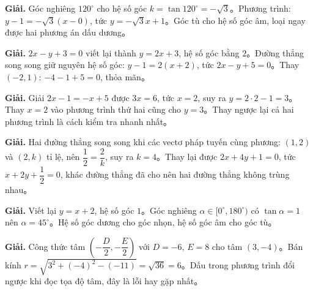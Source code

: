 \documentclass[11pt, a4paper]{article}
\begin{document}
\begin{dapan}[26 — Đáp án B]

\textbf{Giải.} Góc nghiêng $120^\circ$ cho hệ số góc $k=\tan120^\circ=-\sqrt{3}$。Phương trình: $y-1=-\sqrt{3}(x-0)$, tức $y=-\sqrt{3}x+1$。Góc tù cho hệ số góc âm, loại ngay được hai phương án dấu dương。


\end{dapan}
\vspace{0.3cm}
\begin{dapan}[27 — Đáp án B]

\textbf{Giải.} $2x-y+3=0$ viết lại thành $y=2x+3$, hệ số góc bằng $2$。Đường thẳng song song giữ nguyên hệ số góc: $y-1=2(x+2)$, tức $2x-y+5=0$。Thay $(-2,1)$: $-4-1+5=0$, thỏa mãn。


\end{dapan}
\vspace{0.3cm}
\begin{dapan}[28 — Đáp án A]

\textbf{Giải.} Giải $2x-1=-x+5$ được $3x=6$, tức $x=2$, suy ra $y=2\cdot2-1=3$。Thay $x=2$ vào phương trình thứ hai cũng cho $y=3$。Thay ngược lại cả hai phương trình là cách kiểm tra nhanh nhất。


\end{dapan}
\vspace{0.3cm}
\begin{dapan}[29 — Đáp án A]

\textbf{Giải.} Hai đường thẳng song song khi các vectơ pháp tuyến cùng phương: $(1,2)$ và $(2,k)$ tỉ lệ, nên $\dfrac{1}{2}=\dfrac{2}{k}$, suy ra $k=4$。Thay lại được $2x+4y+1=0$, tức $x+2y+\dfrac{1}{2}=0$, khác đường thẳng đã cho nên hai đường thẳng không trùng nhau。


\end{dapan}
\vspace{0.3cm}
\begin{dapan}[30 — Đáp án C]

\textbf{Giải.} Viết lại $y=x+2$, hệ số góc $1$。Góc nghiêng $\alpha\in[0^\circ,180^\circ)$ có $\tan\alpha=1$ nên $\alpha=45^\circ$。Hệ số góc dương cho góc nhọn, hệ số góc âm cho góc tù。


\end{dapan}
\vspace{0.3cm}
\begin{dapan}[31 — Đáp án B]

\textbf{Giải.} Công thức tâm $\left(-\dfrac{D}{2},-\dfrac{E}{2}\right)$ với $D=-6$, $E=8$ cho tâm $(3,-4)$。Bán kính $r=\sqrt{3^2+(-4)^2-(-11)}=\sqrt{36}=6$。Dấu trong phương trình đổi ngược khi đọc tọa độ tâm, đây là lỗi hay gặp nhất。


\end{dapan}
\end{document}
